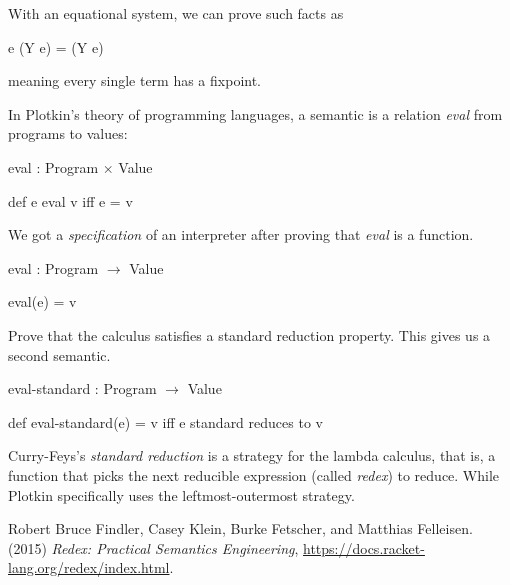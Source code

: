 With an equational system, we can prove such facts as

\centerline{e (Y e) = (Y e)}

meaning every single term has a fixpoint.

In Plotkin's theory of programming languages, a semantic is a relation
\textit{eval} from programs to values:

\centerline{eval : Program $\times$ Value}

\centerline{def e eval v iff e = v}

We got a \textit{specification} of an interpreter after proving that
\textit{eval} is a function.

\centerline{eval : Program $\rightarrow$ Value}

\centerline{eval(e) = v}

Prove that the calculus satisfies a standard reduction property. This gives us a
second semantic.

\centerline{eval-standard : Program $\rightarrow$ Value}

\centerline{def eval-standard(e) = v iff e standard reduces to v}

Curry-Feys's \textit{standard reduction} is a strategy for the lambda calculus,
that is, a function that picks the next reducible expression (called
\textit{redex}) to reduce. While Plotkin specifically uses the
leftmost-outermost strategy.

\begin{thebibliography}{9}
Robert Bruce Findler, Casey Klein, Burke Fetscher, and Matthias Felleisen. (2015) \emph{Redex: Practical Semantics Engineering}, \url{https://docs.racket-lang.org/redex/index.html}.
\end{thebibliography}
